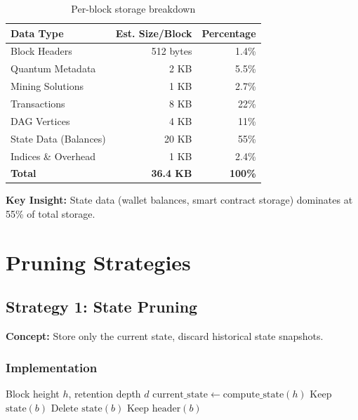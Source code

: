 \documentclass[11pt,a4paper]{article}
\begin{document}
\begin{table}[h]
\centering
\begin{tabular}{lrr}
\toprule
\textbf{Data Type} & \textbf{Est. Size/Block} & \textbf{Percentage} \\
\midrule
Block Headers & 512 bytes & 1.4\% \\
Quantum Metadata & 2 KB & 5.5\% \\
Mining Solutions & 1 KB & 2.7\% \\
Transactions & 8 KB & 22\% \\
DAG Vertices & 4 KB & 11\% \\
State Data (Balances) & 20 KB & 55\% \\
Indices \& Overhead & 1 KB & 2.4\% \\
\midrule
\textbf{Total} & \textbf{36.4 KB} & \textbf{100\%} \\
\bottomrule
\end{tabular}
\caption{Per-block storage breakdown}
\end{table}

\textbf{Key Insight:} State data (wallet balances, smart contract storage) dominates at 55\% of total storage.

\section{Pruning Strategies}

\subsection{Strategy 1: State Pruning}

\textbf{Concept:} Store only the current state, discard historical state snapshots.

\subsubsection{Implementation}

\begin{algorithm}[H]
\caption{State Pruning Algorithm}
\begin{algorithmic}
\REQUIRE Block height $h$, retention depth $d$
\STATE $\text{current\_state} \leftarrow \text{compute\_state}(h)$
\FOR{each block $b$ in range $[h - d, h)$}
    \STATE Keep $\text{state}(b)$ 
\ENDFOR
{}
    \STATE Delete $\text{state}(b)$ 
    \STATE Keep $\text{header}(b)$ 
\ENDFOR
\end{algorithmic}
\end{algorithm}
\end{document}

